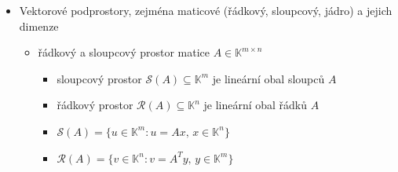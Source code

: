 \begin{itemize}
\begin{itemize}
\begin{itemize}
\item buď $V$ vektorový prostor
\item buď $x_1,\dots,x_m$ lineárně nezávislý systém ve $V$
\item nechť $y_1,\dots,y_n$ je systém generátorů $V$
\item pak platí $m\leq n$ a existují navzájem různé indexy $k_1,\dots,k_{n-m}$ takové, že $x_1,\dots,x_m,y_{k_1},\dots,y_{k_{n-m}}$ tvoří systém generátorů $V$
\end{itemize}
\item báze vektorového prostoru
\begin{itemize}
\item báze vektorového prostoru $V$ je lineárně nezávislá množina $X$, která generuje $V$ (tedy $\text{span}(X)=V$)
\end{itemize}
\item dimenze vektorového prostoru
\begin{itemize}
\item dimenze konečně generovaného vektorového prostoru $V$ je mohutnost (kardinalita / počet prvků) kterékoli z jeho bází; značí se $\mathrm{dim}(V)$
\end{itemize}
\item vektor souřadnic
\begin{itemize}
\item nechť $X=(v_1,\dots,v_n)$ je uspořádaná báze vektorového prostoru $V$ nad $\mathbb K$, potom vektor souřadnic $u \in V$ vzhledem k bázi $X$ je $[u]_x=(\alpha_1,\dots,\alpha_n)^T \in \mathbb K^n$, kde $u=\sum_{i=1}^n\alpha_iv_i$
\end{itemize}
\end{itemize}
\item Vektorové podprostory, zejména maticové (řádkový, sloupcový, jádro) a jejich dimenze
\begin{itemize}
\item řádkový a sloupcový prostor matice $A \in \mathbb K^{m\times n}$
\begin{itemize}
\item sloupcový prostor $\mathcal S(A) \subseteq \mathbb K^m$ je lineární obal sloupců $A$
\item řádkový prostor $\mathcal R(A) \subseteq \mathbb K^n$ je lineární obal řádků $A$
\item $\mathcal S(A)=\lbrace u \in \mathbb K^m:u=Ax,\,x\in \mathbb K^n \rbrace$
\item $\mathcal R(A)=\lbrace v \in \mathbb K^n:v=A^Ty,\,y\in \mathbb K^m \rbrace$

\end{itemize}
\end{itemize}
\end{itemize}

